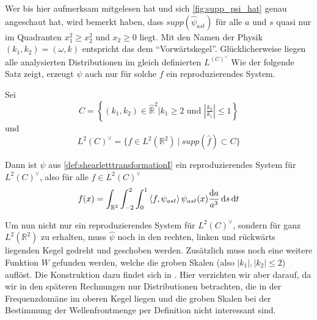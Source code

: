 Wer bis hier aufmerksam mitgelesen hat und sich \cref{fig:supp_psi_hat} genau angeschaut hat, wird bemerkt haben, dass $supp(\hat\psi_{ast})$ für alle $a$ und $s$ quasi nur im Quadranten $x_1^2 \geq x_2^2$ und $x_2 \geq 0$ liegt.
Mit den Namen der Physik $(k_1, k_2) = (\omega, k)$ entspricht das dem "`Vorwärtskegel"'. Glücklicherweise liegen alle analysierten Distributionen im gleich definierten $L^(C)^\vee$
Wie der folgende Satz zeigt, erzeugt $\psi$ auch nur für solche $f$ ein reproduzierendes System.

\begin{theorem}
\label{thm:shearlets_reproduzieren}
    Sei
    \begin{equation*}
        C= \left\{(k_1,k_2)\in \hat{\mathbb{R}}^2
        \Big| k_1 \geq 2 \textrm{ und } \left\lvert\tfrac{k_2}{k_1}\right\rvert \leq 1
        \right\}
    \end{equation*}
    und
    \begin{equation}
        L^2(C)^\vee = \{f \in L^2(\mathbb{R}^2) ~|~ supp (\hat f) \subset C\}
        \label{eq:L2_cone}
    \end{equation}

    Dann ist $\psi$ aus \cref{def:shearletttransformationI} ein reproduzierendes System für $L^2(C)^\vee$, also für alle
    $f \in L^2(C)^\vee$
    \begin{equation}
        f(x) = \int_{\mathbb{R}^2} \int_{-2}^2 \int_0^1
                \left\langle f,\psi_{ast}\right\rangle \psi_{ast}(x)
                \frac{\mathop{}\!\mathrm{d} a}{a^3} \mathop{}\!\mathrm{d} s \mathop{}\!\mathrm{d} t
    \end{equation}
\end{theorem}

Um nun nicht nur ein reproduzierendes System für $L^2(C)^\vee$, sondern für ganz $L^2(\mathbb{R}^2)$ zu erhalten, muss $\hat \psi$ noch in den rechten, linken und rückwärts liegenden Kegel gedreht und geschoben werden. Zusätzlich muss noch eine weitere Funktion $W$ gefunden werden, welche die groben Skalen (also $|k_1|, |k_2| \leq 2$) auflöst. Die Konstruktion dazu findet sich in \textcite[S. 7 ff]{Kutyniok2008}. Hier verzichten wir aber darauf, da wir in den späteren Rechnungen nur Distributionen betrachten, die in der Frequenzdomäne im oberen Kegel liegen und die groben Skalen bei der Bestimmung der Wellenfrontmenge per Definition nicht interessant sind.

